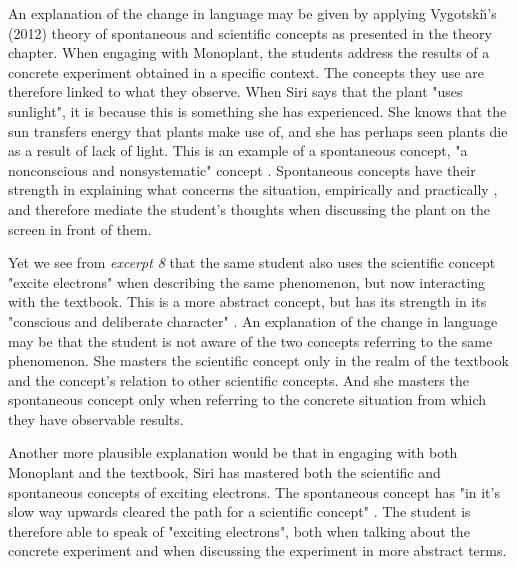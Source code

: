 An explanation of the change in language may be given by applying Vygotski{\u\i}'s (2012) theory of spontaneous and scientific concepts as presented in the theory chapter. When engaging with Monoplant, the students address the results of a concrete experiment obtained in a specific context. The concepts they use are therefore linked to what they observe. When Siri says that the plant "uses sunlight", it is because this is something she has experienced. She knows that the sun transfers energy that plants make use of, and she has perhaps seen plants die as a result of lack of light. This is an example of a spontaneous concept, "a nonconscious and nonsystematic" concept \citep{vygotsky2012thought}. Spontaneous concepts have their strength in explaining what concerns the situation, empirically and practically \citep{vygotsky2012thought}, and  therefore mediate the student's thoughts when discussing the plant on the screen in front of them. 


Yet we see from \emph{excerpt 8} that the same student also uses the scientific concept "excite electrons" when describing the same phenomenon, but now interacting with the textbook. This is a more abstract concept, but has its strength in its "conscious and deliberate character" \citep{vygotsky2012thought}. An explanation of the change in language may be that the student is not aware of the two concepts referring to the same phenomenon. She masters the scientific concept only in the realm of the textbook and the concept's relation to other scientific concepts. And she masters the spontaneous concept only when referring to the concrete situation from which they have observable results. 

Another more plausible explanation would be that in engaging with both Monoplant and the textbook, Siri has mastered both the scientific and spontaneous concepts of exciting electrons. The spontaneous concept has "in it's slow way upwards cleared the path for a scientific concept" \citep{vygotsky2012thought}. The student is therefore able to speak of "exciting electrons", both when talking about the concrete experiment and when discussing the experiment in more abstract terms. 

